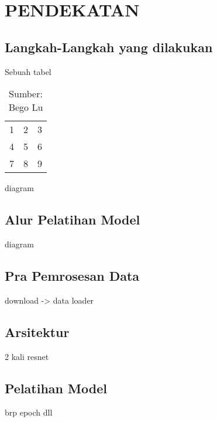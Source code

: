 
\chapter{PENDEKATAN}
\label{cha:3-Pendekatan}

\section{Langkah-Langkah yang dilakukan}
\label{sec:3-Motivasi}

\begin{table}[htbp]
    \captionsetup{labelfont=bf, textfont=bf}
    \caption{Sebuah tabel}
    \vspace{-20pt}
    \begin{center}
        \begin{tabular}{| l c r |}
            \hline
            1 & 2 & 3 \\
            4 & 5 & 6 \\
            7 & 8 & 9 \\
            \hline
        \end{tabular}
    \end{center}
    \vspace{-10pt}
    \captionsetup{labelfont=md, textfont=md}
    \caption*{Sumber: Bego Lu}
\end{table}


diagram

\section{Alur Pelatihan Model}
diagram

\section{Pra Pemrosesan Data}
download -> data loader

\section{Arsitektur}
2 kali resnet

\section{Pelatihan Model}
brp epoch dll
